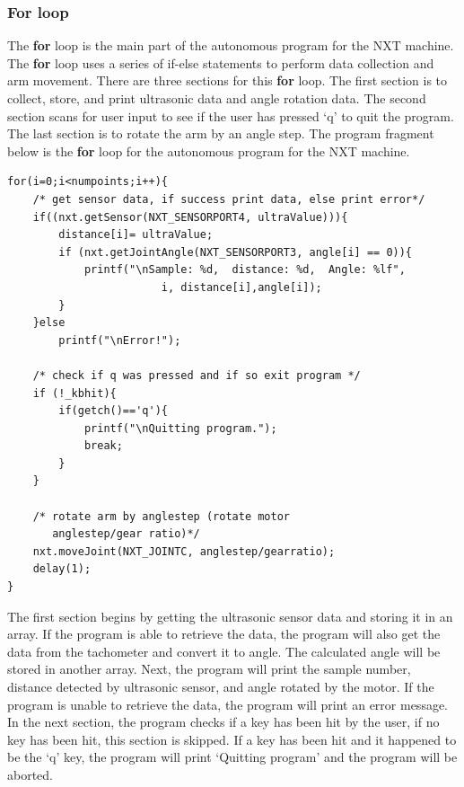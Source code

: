 \documentclass[11pt]{article}
\begin{document}
\subsubsection*{For loop}
The {\bf for} loop is the main part of the autonomous program for the NXT machine.
The {\bf for} loop uses a series of if-else statements to perform data collection 
and arm movement. There are three sections for this {\bf for} loop. The first 
section is to collect, store, and print ultrasonic data and angle rotation data. 
The second section scans for user input to see if the user has pressed `q' to quit 
the program. The last section is to rotate the arm by an angle step. The program 
fragment below is the {\bf for} loop for the autonomous program for the NXT machine.
\begin{lstlisting}
for(i=0;i<numpoints;i++){
    /* get sensor data, if success print data, else print error*/
    if((nxt.getSensor(NXT_SENSORPORT4, ultraValue))){
        distance[i]= ultraValue;
        if (nxt.getJointAngle(NXT_SENSORPORT3, angle[i] == 0)){
            printf("\nSample: %d,  distance: %d,  Angle: %lf",
                        i, distance[i],angle[i]);
        }
    }else	
        printf("\nError!");

    /* check if q was pressed and if so exit program */
    if (!_kbhit){
        if(getch()=='q'){
            printf("\nQuitting program.");
            break;
        }
    }		

    /* rotate arm by anglestep (rotate motor 
       anglestep/gear ratio)*/
    nxt.moveJoint(NXT_JOINTC, anglestep/gearratio);
    delay(1);
}
\end{lstlisting}
The first section begins by getting the ultrasonic sensor data and storing it in 
an array. If the program is able to retrieve the data, the program will also 
get the data from the tachometer and convert it to angle. The calculated angle 
will be stored in another array. Next, the program will print the sample number, 
distance detected by ultrasonic sensor, and angle rotated by the motor. If the 
program is unable to retrieve the data, the program will print an error message.\\ 

In the next section, the program checks if a key has been hit by the user, if 
no key has been hit, this section is skipped. If a key has been hit and it 
happened to be the `q' key, the program will print `Quitting program' and the 
program will be aborted.\\
\end{document}
